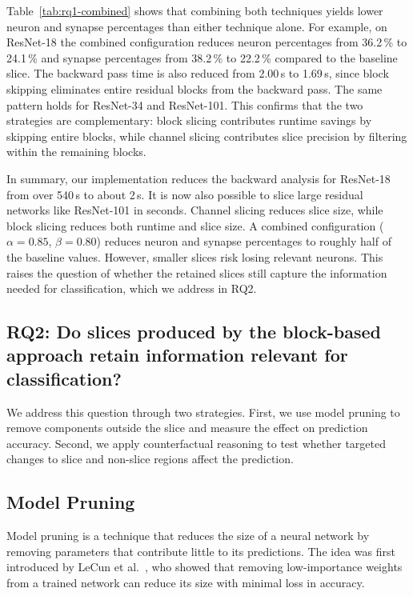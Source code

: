 \documentclass[
12pt,
fancyheadings,
a4paper,
twoside,
BCOR=0.7cm,
nobcorignoretitle,
grayscalebody,
]{stsreprt}
\begin{document}
Table~\ref{tab:rq1-combined} shows that combining both techniques yields lower neuron and synapse
percentages than either technique alone.
For example, on ResNet-18 the combined configuration reduces neuron percentages from 36.2\,\% to
24.1\,\% and synapse percentages from 38.2\,\% to 22.2\,\% compared to the baseline slice.
The backward pass time is also reduced from 2.00\,s to 1.69\,s, since block skipping eliminates
entire residual blocks from the backward pass.
The same pattern holds for ResNet-34 and ResNet-101.
This confirms that the two strategies are complementary: block slicing contributes runtime savings
by skipping entire blocks, while channel slicing contributes slice precision by filtering within
the remaining blocks.

\vspace{0.2cm}

In summary, our implementation reduces the backward analysis for ResNet-18 from over 540\,s to
about 2\,s.
It is now also possible to slice large residual networks like ResNet-101 in seconds.
Channel slicing reduces slice size, while block slicing reduces both runtime and slice size.
A combined configuration ($\alpha{=}0.85$, $\beta{=}0.80$) reduces neuron and synapse percentages
to roughly half of the baseline values.
However, smaller slices risk losing relevant neurons.
This raises the question of whether the retained slices still capture the information needed for
classification, which we address in RQ2.

\subsection*{RQ2: Do slices produced by the block-based approach retain information relevant for classification?}

We address this question through two strategies.
First, we use model pruning to remove components outside the slice and measure the effect on
prediction accuracy.
Second, we apply counterfactual reasoning to test whether targeted changes to slice and non-slice
regions affect the prediction.

\subsection*{Model Pruning}

Model pruning is a technique that reduces the size of a neural network by removing parameters that
contribute little to its predictions.
The idea was first introduced by LeCun et al.~\cite{lecun1989optimal}, who showed that removing
low-importance weights from a trained network can reduce its size with minimal loss in accuracy.
\end{document}
